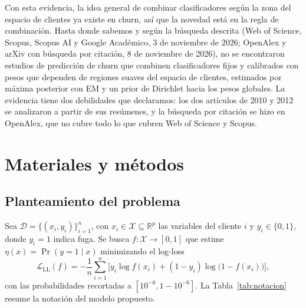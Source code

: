 \documentclass[11pt,a4paper]{article}
\begin{document}
Con esta evidencia, la idea general de combinar clasificadores según la zona del espacio de clientes ya existe en churn, así que la novedad está en la regla de combinación. Hasta donde sabemos y según la búsqueda descrita (Web of Science, Scopus, Scopus AI y Google Académico, 3 de noviembre de 2026; OpenAlex y arXiv con búsqueda por citación, 8 de noviembre de 2026), no se encontraron estudios de predicción de churn que combinen clasificadores fijos y calibrados con pesos que dependen de regiones suaves del espacio de clientes, estimados por máxima posterior con EM y un prior de Dirichlet hacia los pesos globales. La evidencia tiene dos debilidades que declaramos: los dos artículos de 2010 y 2012 se analizaron a partir de sus resúmenes, y la búsqueda por citación se hizo en OpenAlex, que no cubre todo lo que cubren Web of Science y Scopus.

\section{Materiales y métodos}\label{sec:methods}

\subsection{Planteamiento del problema}
Sea $\mathcal D=\{(x_i,y_i)\}_{i=1}^n$, con $x_i\in\mathcal X\subseteq\mathbb R^p$ las variables del cliente $i$ y $y_i\in\{0,1\}$, donde $y_i=1$ indica fuga. Se busca $f:\mathcal X\to[0,1]$ que estime $\eta(x)=\Pr(y=1\mid x)$ minimizando el log-loss
\begin{equation}
\mathcal L_{\mathrm{LL}}(f)=-\frac1n\sum_{i=1}^n\Big[y_i\log f(x_i)+(1-y_i)\log\big(1-f(x_i)\big)\Big],
\label{eq:logloss}
\end{equation}
con las probabilidades recortadas a $[10^{-6},1-10^{-6}]$. La Tabla~\ref{tab:notacion} resume la notación del modelo propuesto.
\end{document}
